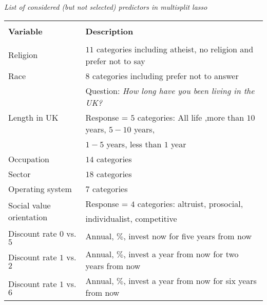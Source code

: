 \documentclass[a4paper,12pt]{article}
\begin{document}
{\centering
\begin{threeparttable}
\caption{\textit{\vspace{-0.3cm}List of considered (but not selected) predictors in multisplit lasso}}
\label{PotentialPredictors} 
\centering
\begin{small}
\begin{tabular}{ll} 
\hline \vspace{-0.25cm} \\	
  \multicolumn{1}{l}{\vspace{0.1cm}\textbf{Variable}}&   \multicolumn{1}{l}{\textbf{Description}}   \\ 
\hline \vspace{-0.3cm} \\ 
\vspace{0.15cm}Religion& $11$ categories including atheist, no religion and prefer not to say\\
\vspace{0.15cm}Race& $8$ categories including prefer not to answer\\
\multirow{3}{*}{Length in UK}&Question: \textit{How long have you been living in the UK?}\\
&Response = $5$ categories: All life ,more than $10$ years, $5-10$ years,\\
\vspace{0.15cm}& $1-5$ years, less than $1$ year\\
\vspace{0.15cm}Occupation&$14$ categories\\
\vspace{0.15cm}Sector&$18$ categories\\
\vspace{0.15cm}Operating system&$7$ categories\\
\multirow{2}{*}{Social value orientation}&Response = $4$ categories: altruist, prosocial,\\
\vspace{0.15cm}& individualist, competitive\\
\vspace{0.15cm}Discount rate $0$ vs. $5$&Annual, $\%$, invest now for five years from now \\
\vspace{0.15cm}Discount rate $1$ vs. $2$&Annual, $\%$, invest a year from now for two years from now \\
\vspace{0.15cm}Discount rate $1$ vs. $6$&Annual, $\%$, invest a year from now for six years from now \\

\end{tabular}
\end{small}
\end{threeparttable}}
\end{document}
